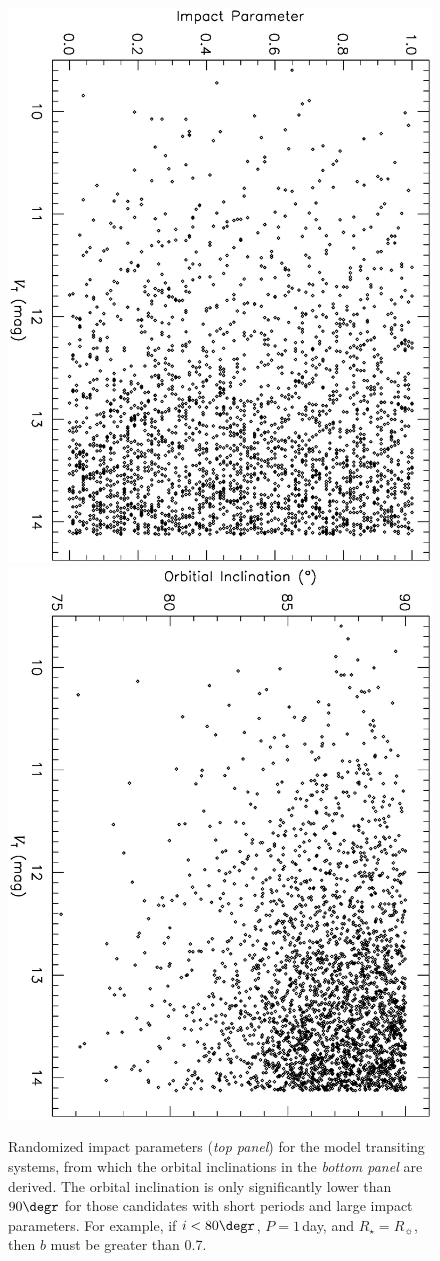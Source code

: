 \begin{figure}
\begin{center}
\centering
\includegraphics[width=.55\textwidth, angle=90]{7_orb_a}\\
\includegraphics[width=.55\textwidth, angle=90]{7_orb_b}\\
\caption[Randomized transit impact parameters and orbital inclinations]{%
Randomized impact parameters ({\it top panel}) for the model
transiting systems, from which the orbital inclinations in the {\it bottom panel} are derived.
The orbital inclination is only significantly lower than $90\degr$ for those candidates with short periods and large impact parameters.
For example, if $i<80\degr$, $P=1$\,day, and $R_{\star}=R_{\sun}$, then $b$ must be greater than 0.7. %
}
\label{cha:human:sec:model:fig:orb}
\end{center}
\end{figure}

